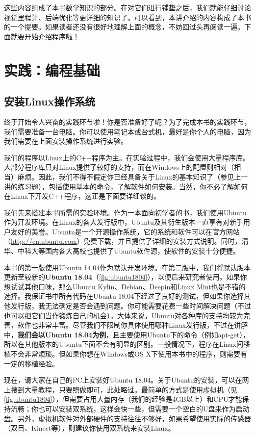 这些内容组成了本书数学知识的部分。在对它们进行铺垫之后，我们就能仔细讨论视觉里程计、后端优化等更详细的知识了。可以看到，本讲介绍的内容构成了本书的一个提要。如果读者还没有很好地理解上面的概念，不妨回过头再阅读一遍。下面就要开始介绍程序啦！

\section{实践：编程基础}
\subsection{安装Linux操作系统}
终于开始令人兴奋的实践环节啦！你是否准备好了呢？为了完成本书的实践环节，我们需要准备一台电脑。你可以使用笔记本或台式机，最好是你个人的电脑，因为我们需要在上面安装操作系统进行实验。

我们的程序以Linux上的C++程序为主。在实验过程中，我们会使用大量程序库。大部分程序库只对Linux提供了较好的支持，而在Windows上的配置则相对（相当）麻烦。因此，我们不得不假定你已经具备关于Linux的基本知识了（参见上一讲的练习题），包括使用基本的命令，了解软件如何安装。当然，你不必了解如何在Linux下开发C++程序，这正是下面要详细谈的。

我们先来搭建本书所需的实验环境。作为一本面向初学者的书，我们使用Ubuntu作为开发环境。在Linux的各大发行版中，Ubuntu及其衍生版本一直享有对新手用户友好的美誉。Ubuntu是一个开源操作系统，它的系统和软件可以在官方网站（\url{http://cn.ubuntu.com}）免费下载，并且提供了详细的安装方式说明。同时，清华、中科大等国内各大高校也提供了Ubuntu软件源，使软件的安装十分便捷。

本书的第一版使用Ubuntu 14.04作为默认开发环境。在第二版中，我们将默认版本更新至较新的\textbf{Ubuntu 18.04}（\autoref{fig:ubuntu1804}），以便后来研究者使用。如果你想试试其他口味，那么Ubuntu Kylin、Debian、Deepin和Linux Mint也是不错的选择。我保证书中所有代码在Ubuntu 18.04下经过了良好的测试，但如果你选择其他发行版，我无法确定是否会遇到问题。你可能需要花费一些时间解决问题（不过也可以把它们当作锻炼自己的机会）。大体来说，Ubuntu对各种库的支持均较为完善，软件也非常丰富。尽管我们不限制你具体使用哪种Linux发行版，不过在讲解中，\textbf{我们会以Ubuntu 18.04为例}，且主要使用Ubuntu下的命令（例如apt-get），所以在其他版本的Ubuntu下面不会有明显的区别。一般情况下，程序在Linux间移植不会非常烦琐。但如果你想在Windows或OS X下使用本书中的程序，则需要有一定的移植经验。

现在，请大家在自己的PC上安装好Ubuntu 18.04。关于Ubuntu的安装，可以在网上搜到大量教程，只要照做即可，此处略过。最简单的方式是使用虚拟机（见\autoref{fig:ubuntu1804}），但需要占用大量内存（我们的经验是4GB以上）和CPU才能保持流畅；你也可以安装双系统，这样会快一些，但需要一个空白的U盘来作为启动盘。另外，虚拟机软件对外部硬件的支持往往不够好，如果希望使用实际的传感器（双目、Kinect等），则建议你使用双系统来安装Linux。


